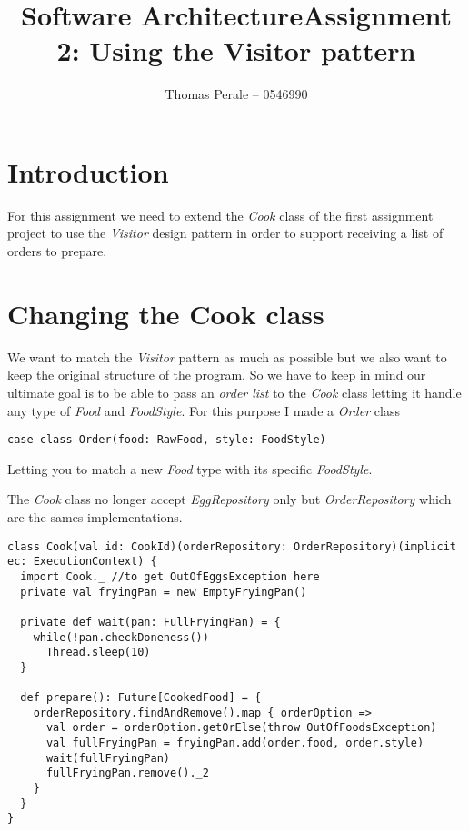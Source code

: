 \documentclass[a4paper,11pt]{article}
\begin{document}
\title{Software Architecture}
\title{Assignment 2: Using the Visitor pattern}
\author{Thomas Perale -- 0546990}

\maketitle

\section{Introduction}

For this assignment we need to extend the \emph{Cook} class of the
first assignment project to use the \emph{Visitor} design pattern in
order to support receiving a list of orders to prepare.

\section{Changing the Cook class}

We want to match the \emph{Visitor} pattern as much as possible but we also want
to keep the original structure of the program. So we have to keep in mind our ultimate
goal is to be able to pass an \emph{order list} to the \emph{Cook} class letting
it handle any type of \emph{Food} and \emph{FoodStyle}. For this purpose I made
a \emph{Order} class

\begin{lstlisting}[style=scala]
case class Order(food: RawFood, style: FoodStyle)
\end{lstlisting}

Letting you to match a new \emph{Food} type with its specific \emph{FoodStyle}.

The \emph{Cook} class no longer accept \emph{EggRepository} only but \emph{OrderRepository}
which are the sames implementations.

\begin{lstlisting}[style=scala]
class Cook(val id: CookId)(orderRepository: OrderRepository)(implicit ec: ExecutionContext) {
  import Cook._ //to get OutOfEggsException here
  private val fryingPan = new EmptyFryingPan()

  private def wait(pan: FullFryingPan) = {
    while(!pan.checkDoneness())
      Thread.sleep(10)
  }

  def prepare(): Future[CookedFood] = {
    orderRepository.findAndRemove().map { orderOption =>
      val order = orderOption.getOrElse(throw OutOfFoodsException)
      val fullFryingPan = fryingPan.add(order.food, order.style)
      wait(fullFryingPan)
      fullFryingPan.remove()._2
    }
  }
}
\end{lstlisting}
\end{document}
